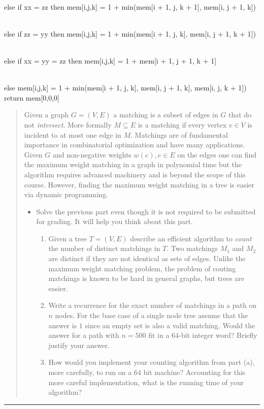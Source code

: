 \documentclass[11pt]{article}
\begin{document}
\begin{solution}
\begin{algo}
        \\ else if xx = zz then mem[i,j,k] = 1 + min(mem[i + 1, j, k + 1], mem[i, j + 1, k])

        \\ else if zz = yy then mem[i,j,k] = 1 + min(mem[i + 1, j, k], mem[i, j + 1, k + 1])

        \\ else if xx = yy = zz then mem[i,j,k] = 1 + mem[i + 1, j + 1, k + 1]

        \\ else mem[i,j,k] = 1 + min(mem[i + 1, j, k], mem[i, j + 1, k], mem[i, j, k + 1]) \-\-\-
        \\ return mem[0,0,0]
    \end{algo}
\end{solution}


\begin{quote}
Given a graph $G=(V,E)$ a matching is a subset of edges in $G$
  that do not \emph{intersect}. More formally $M \subseteq E$ is a
  matching if every vertex $v \in V$ is incident to at most one edge
  in $M$. Matchings are of fundamental importance in combinatorial
  optimization and have many applications. Given $G$ and non-negative
  weights $w(e), e \in E$ on the edges one can find the maximum weight
  matching in a graph in polynomial time but the algorithm requires
  advanced machinery and is beyond the scope of this course. However,
  finding the maximum weight matching in a tree is easier via dynamic
  programming. 

  \begin{itemize}
  \item Solve the previous part even though it is not required to be
    submitted for grading. It will help you think about this part.
    \begin{enumerate}
    \item Given a tree $T=(V,E)$ describe an efficient algorithm to
      \emph{count} the number of distinct matchings in $T$. Two matchings
      $M_1$ and $M_2$ are distinct if they are not identical as sets of edges.
      Unlike the maximum weight matching problem, the problem of couting
      matchings is known to be hard in general graphs, but trees are
      easier. 
    \item Write a recurrence for the exact number of matchings in a
      path on $n$ nodes. For the base case of a single node tree
      assume that the answer is $1$ since an empty set is also a valid
      matching. Would the answer for a path with $n=500$ fit in a
      $64$-bit integer word? Briefly justify your answer.
    \item How would you implement your counting algorithm from part
      (a), more carefully, to run on a $64$ bit machine?  Accounting
      for this more careful implementation, what is the running time of
      your algorithm? 
    \end{enumerate}
  \end{itemize}
\end{quote}
\hrule
\end{document}
